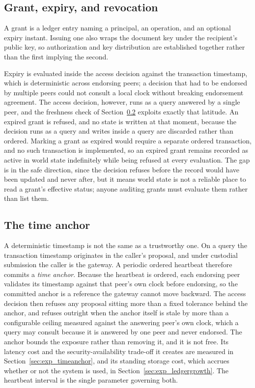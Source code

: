 \documentclass[preprint,12pt]{elsarticle}
\begin{document}
\subsection{Grant, expiry, and revocation}
\label{sec:grants}

A grant is a ledger entry naming a principal, an operation, and an optional
expiry instant. Issuing one also wraps the document key under the recipient's
public key, so authorization and key distribution are established together
rather than the first implying the second.

Expiry is evaluated inside the access decision against the transaction
timestamp, which is deterministic across endorsing peers; a decision that
had to be endorsed by multiple peers could not consult a local clock without
breaking endorsement agreement. The access decision, however, runs as a query
answered by a single peer, and the freshness check of
Section~\ref{sec:timeanchor_arch} exploits exactly that latitude. An expired grant is refused, and no state is written at that moment, because
the decision runs as a query and writes inside a query are discarded rather
than ordered. Marking a grant as expired would require a separate ordered
transaction, and no such transaction is implemented, so an expired grant
remains recorded as active in world state indefinitely while being refused at
every evaluation. The gap is in the safe direction, since the decision refuses
before the record would have been updated and never after, but it means world
state is not a reliable place to read a grant's effective status; anyone
auditing grants must evaluate them rather than list them.

\subsection{The time anchor}
\label{sec:timeanchor_arch}

A deterministic timestamp is not the same as a trustworthy one. On a query
the transaction timestamp originates in the caller's proposal, and under
custodial submission the caller is the gateway. A periodic ordered heartbeat
therefore commits a \emph{time anchor}. Because the heartbeat is ordered, each
endorsing peer validates its timestamp against that peer's own clock before
endorsing, so the committed anchor is a reference the gateway cannot move
backward. The access decision then refuses any proposal sitting more than a
fixed tolerance behind the anchor, and refuses outright when the anchor
itself is stale by more than a configurable ceiling measured against the
answering peer's own clock, which a query may consult because it is answered
by one peer and never endorsed. The anchor bounds the exposure rather than removing
it, and it is not free. Its latency cost and the security-availability
trade-off it creates are measured in Section~\ref{sec:exp_timeanchor}, and its
standing storage cost, which accrues whether or not the system is used, in
Section~\ref{sec:exp_ledgergrowth}. The heartbeat interval is the single
parameter governing both.
\end{document}
